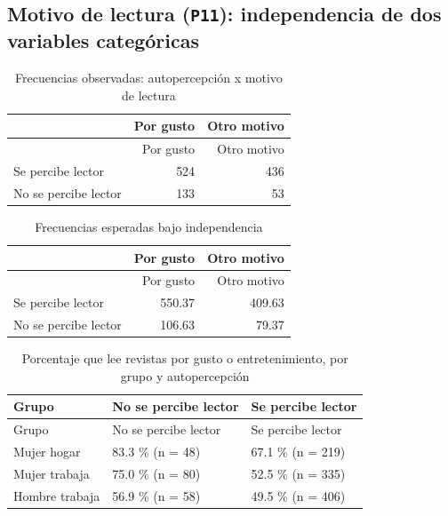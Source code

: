 \documentclass[
  spanish,
  11pt,
]{extarticle}
\begin{document}
\subsection{\texorpdfstring{Motivo de lectura (\texttt{P11}):
independencia de dos variables
categóricas}{Motivo de lectura (P11): independencia de dos variables categóricas}}\label{motivo-de-lectura-p11-independencia-de-dos-variables-categuxf3ricas}

\begin{longtable}[]{@{}lrr@{}}
\caption{Frecuencias observadas: autopercepción x motivo de
lectura}\tabularnewline
\toprule\noalign{}
& Por gusto & Otro motivo \\
\midrule\noalign{}
\endfirsthead
\toprule\noalign{}
& Por gusto & Otro motivo \\
\midrule\noalign{}
\endhead
\bottomrule\noalign{}
\endlastfoot
Se percibe lector & 524 & 436 \\
No se percibe lector & 133 & 53 \\
\end{longtable}

\begin{longtable}[]{@{}lrr@{}}
\caption{Frecuencias esperadas bajo independencia}\tabularnewline
\toprule\noalign{}
& Por gusto & Otro motivo \\
\midrule\noalign{}
\endfirsthead
\toprule\noalign{}
& Por gusto & Otro motivo \\
\midrule\noalign{}
\endhead
\bottomrule\noalign{}
\endlastfoot
Se percibe lector & 550.37 & 409.63 \\
No se percibe lector & 106.63 & 79.37 \\
\end{longtable}

\begin{longtable}[]{@{}lll@{}}
\caption{Porcentaje que lee revistas por gusto o entretenimiento, por
grupo y autopercepción}\tabularnewline
\toprule\noalign{}
Grupo & No se percibe lector & Se percibe lector \\
\midrule\noalign{}
\endfirsthead
\toprule\noalign{}
Grupo & No se percibe lector & Se percibe lector \\
\midrule\noalign{}
\endhead
\bottomrule\noalign{}
\endlastfoot
Mujer hogar & 83.3 \% (n = 48) & 67.1 \% (n = 219) \\
Mujer trabaja & 75.0 \% (n = 80) & 52.5 \% (n = 335) \\
Hombre trabaja & 56.9 \% (n = 58) & 49.5 \% (n = 406) \\
\end{longtable}
\end{document}
